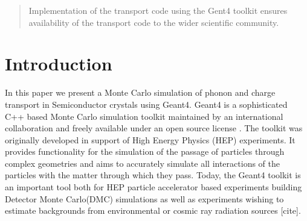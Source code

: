 \documentclass[preprint,12pt]{elsarticle}
\begin{document}
\begin{frontmatter}
\begin{abstract}
Implementation of the transport code using the Gent4 toolkit ensures availability of the transport code to the wider scientific community.

\end{abstract}

\begin{keyword}


\end{keyword}

\end{frontmatter}





\section{Introduction}
\label{sec:Introduction}

In this paper we present a Monte Carlo simulation of phonon and charge transport in Semiconductor crystals using Geant4. Geant4 is a sophisticated C++ based Monte Carlo simulation toolkit maintained by an international collaboration and freely available under an open source license \cite{Geant-A} \cite{Geant-B}. The toolkit was originally developed in support of High Energy Physics (HEP) experiments. It provides functionality for the simulation of the passage of particles through complex geometries and aims to accurately simulate all interactions of the particles with the matter through which they pass. Today, the Geant4 toolkit is an important tool both for HEP particle accelerator based experiments building Detector Monte Carlo(DMC) simulations as well as experiments wishing to estimate backgrounds from environmental or cosmic ray radiation sources [cite]\cite{Brandt}.
\end{document}
